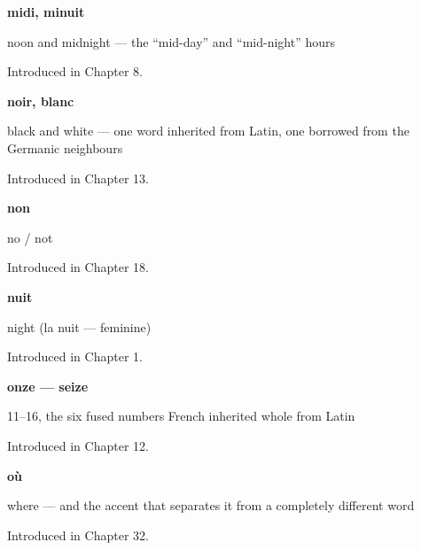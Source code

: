\noindent\begin{minipage}[t]{\linewidth}
\raggedright
\textbf{midi, minuit}\par
\small noon and midnight — the \textquotedblleft{}mid-day\textquotedblright{} and \textquotedblleft{}mid-night\textquotedblright{} hours\par
\footnotesize Introduced in Chapter 8.
\end{minipage}\par\medskip

\noindent\begin{minipage}[t]{\linewidth}
\raggedright
\textbf{noir, blanc}\par
\small black and white — one word inherited from Latin, one borrowed from the Germanic neighbours\par
\footnotesize Introduced in Chapter 13.
\end{minipage}\par\medskip

\noindent\begin{minipage}[t]{\linewidth}
\raggedright
\textbf{non}\par
\small no / not\par
\footnotesize Introduced in Chapter 18.
\end{minipage}\par\medskip

\noindent\begin{minipage}[t]{\linewidth}
\raggedright
\textbf{nuit}\par
\small night (la nuit — feminine)\par
\footnotesize Introduced in Chapter 1.
\end{minipage}\par\medskip

\noindent\begin{minipage}[t]{\linewidth}
\raggedright
\textbf{onze — seize}\par
\small 11–16, the six fused numbers French inherited whole from Latin\par
\footnotesize Introduced in Chapter 12.
\end{minipage}\par\medskip

\noindent\begin{minipage}[t]{\linewidth}
\raggedright
\textbf{où}\par
\small where — and the accent that separates it from a completely different word\par
\footnotesize Introduced in Chapter 32.
\end{minipage}\par\medskip


